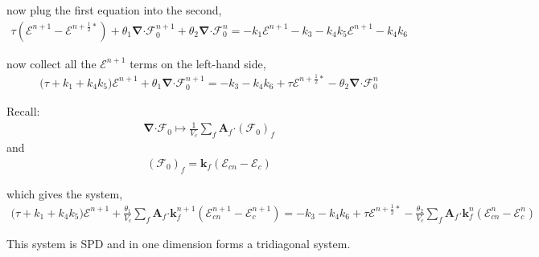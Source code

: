\documentclass[10pt,letterpaper,notitlepage]{article}
\numberwithin{equation}{section}
\newcommand{\bnabla}{\boldsymbol{\nabla}}
\newcommand{\dotp}{\boldsymbol{\cdot}}
\newcommand{\RadE}{\mathcal{E}}
\newcommand{\RadF}{\boldsymbol{\mathcal{F}}}
\newcommand{\RadJ}{\RadF_0}
\newcommand{\AreaVec}{\mathbf{A}}
\newcommand{\half}{\frac{1}{2}}
\newcommand{\beqn}{\begin{equation}\begin{aligned}}
\newcommand{\eeqn}{\end{aligned}\end{equation}}
\newcommand{\splitline}{\noindent\makebox[\linewidth]{\rule{\paperwidth}{0.4pt}}}
\begin{document}
\splitline

now plug the first equation into the second,
\begin{subequations}
	\beqn 
	\tau (\RadE^{n+1} - \RadE^{n+\half*}) 
	+ \theta_1 \bnabla \dotp  \RadJ^{n+1} + \theta_2 \bnabla \dotp \RadJ^{n} = 
	-k_1\RadE^{n+1} 
	-k_3
	-k_4 k_5 \RadE^{n+1} -k_4 k_6
	\eeqn
\end{subequations}

\splitline

now collect all the $\RadE^{n+1}$ terms on the left-hand side,
\begin{subequations}
	\beqn 
	\big( \tau + k_1 + k_4 k_5\big) \RadE^{n+1} 
	+ \theta_1 \bnabla \dotp  \RadJ^{n+1} = 
	-k_3
	-k_4 k_6
	+ \tau \RadE^{n+\half*}
	- \theta_2 \bnabla \dotp \RadJ^{n}
	\eeqn
\end{subequations}

\splitline 

Recall:
\beqn 
\bnabla \dotp \RadJ \mapsto 
\frac{1}{V_c} \sum_f \AreaVec_f \dotp (\RadJ)_f
\eeqn
and
\beqn 
(\RadJ)_f = \mathbf{k}_f ( \RadE_{cn} - \RadE_c)
\eeqn  

\splitline

which gives the system,
\begin{subequations}
	\beqn 
	\big( \tau + k_1 + k_4 k_5\big) \RadE^{n+1} 
	+ 
	\frac{\theta_1}{V_c} \sum_f \AreaVec_f \dotp  \mathbf{k}_f^{n+1} ( \RadE_{cn}^{n+1} - \RadE_c^{n+1}) 
	= 
	-k_3
	-k_4 k_6
	+ \tau \RadE^{n+\half*}
	- 
	\frac{\theta_2}{V_c} \sum_f \AreaVec_f \dotp  \mathbf{k}_f^{n} ( \RadE_{cn}^{n} - \RadE_c^{n}) 
	\eeqn
\end{subequations}

\splitline

This system is SPD and in one dimension forms a tridiagonal system.





\newpage
\end{document}
